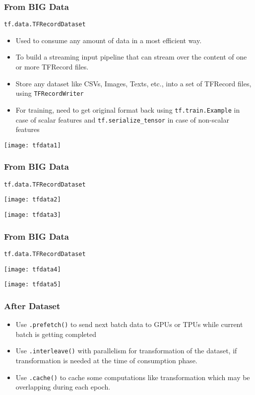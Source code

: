 \begin{frame}[fragile]\frametitle{From BIG Data}
\lstinline|tf.data.TFRecordDataset|

\begin{itemize}
\item Used to consume any amount of data in a most efficient way.
\item To build a streaming input pipeline that can stream over the content of one or more TFRecord files.
\item Store any dataset like CSVs, Images, Texts, etc., into a set of TFRecord files, using \lstinline|TFRecordWriter|
\item For training, need to get original format back using \lstinline|tf.train.Example| in case of scalar features and \lstinline|tf.serialize_tensor| in case of non-scalar features
\end{itemize}

\begin{center}
\texttt{[image: tfdata1]}
\end{center}
\end{frame}

\begin{frame}[fragile]\frametitle{From BIG Data}
\lstinline|tf.data.TFRecordDataset|

\begin{center}
\texttt{[image: tfdata2]}

\texttt{[image: tfdata3]}


\end{center}
\end{frame}

\begin{frame}[fragile]\frametitle{From BIG Data}
\lstinline|tf.data.TFRecordDataset|

\begin{center}

\texttt{[image: tfdata4]}

\texttt{[image: tfdata5]}


\end{center}
\end{frame}

\begin{frame}[fragile]\frametitle{After Dataset}
\begin{itemize}
\item Use \lstinline|.prefetch()| to send next batch data to GPUs or TPUs while current batch is getting completed
\item Use \lstinline|.interleave()| with parallelism for transformation of the dataset, if transformation is needed at the time of consumption phase. 
\item Use \lstinline|.cache()| to cache some computations like transformation which may be overlapping during each epoch.
\end{itemize}
\end{frame}
